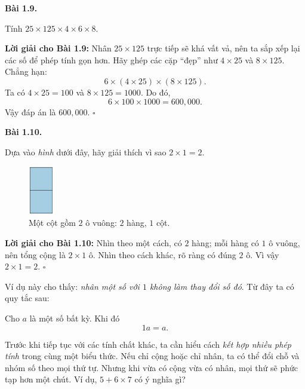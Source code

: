 \documentclass[14pt,a4paper]{extbook}
\newenvironment{problem}[1][]{
  \par\noindent\textbf{Bài #1.}\ \ignorespaces
}{\par}
\begin{document}
\begin{problem}[1.9]
Tính \(25 \times 125 \times 4 \times 6 \times 8\).
\end{problem}

\noindent\textbf{Lời giải cho Bài 1.9:}
Nhân \(25\times125\) trực tiếp sẽ khá vất vả, nên ta sắp xếp lại các số
để phép tính gọn hơn. Hãy ghép các cặp “đẹp” như \(4\times25\) và
\(8\times125\). Chẳng hạn:
\[
6 \times (4\times25) \times (8\times125).
\]
Ta có \(4\times25=100\) và \(8\times125=1000\).
Do đó,
\[
6 \times 100 \times 1000 = 600{,}000.
\]
Vậy đáp án là \(\boxed{600{,}000}\). \(\square\)

\begin{problem}[1.10]
Dựa vào \emph{hình} dưới đây, hãy giải thích vì sao \(2\times1=2\).
\begin{figure}[ht!]
  \centering
  \includegraphics[width=0.10\textwidth]{img/fig-prob1.10.pdf}
  \caption*{\small Một cột gồm \(2\) ô vuông: \(2\) hàng, \(1\) cột.}
\end{figure}
\end{problem}

\noindent\textbf{Lời giải cho Bài 1.10:}
Nhìn theo một cách, có \(2\) hàng; mỗi hàng có \(1\) ô vuông, nên tổng cộng
là \(2\times1\) ô. Nhìn theo cách khác, rõ ràng có đúng \(2\) ô. Vì vậy
\(2\times1=2\). \(\square\)

Ví dụ này cho thấy: \emph{nhân một số với \(1\) không làm thay đổi số đó}.
Từ đây ta có quy tắc sau:

\begin{tcolorbox}[colback=yellow!10, colframe=orange!80!black,
title={Quan trọng: Nhân với số \(1\)}]
Cho \(a\) là một số bất kỳ. Khi đó
\[
1a = a.
\]
\end{tcolorbox}

Trước khi tiếp tục với các tính chất khác, ta cần hiểu cách \emph{kết hợp
nhiều phép tính} trong cùng một biểu thức. Nếu chỉ cộng hoặc chỉ nhân,
ta có thể đổi chỗ và nhóm số theo mọi thứ tự. Nhưng khi vừa có cộng vừa
có nhân, mọi thứ sẽ phức tạp hơn một chút. Ví dụ, \(5+6\times7\) có ý
nghĩa gì?
\end{document}

